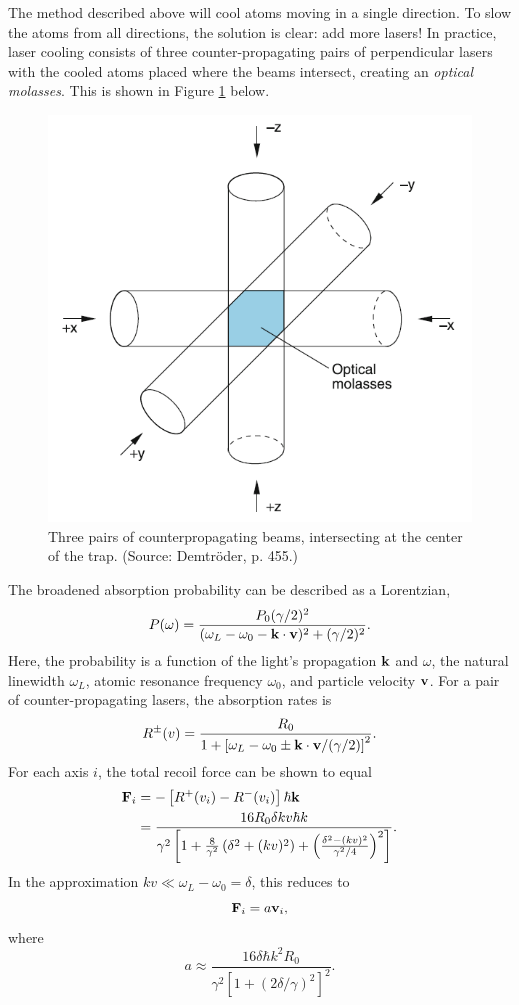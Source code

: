 \documentclass{homework}
\begin{document}
	
	The method described above will cool atoms moving in a single direction. To slow the atoms from all directions, the solution is clear: add more lasers! In practice, laser cooling consists of three counter-propagating pairs of perpendicular lasers with the cooled atoms placed where the beams intersect, creating an \textit{optical molasses}. This is shown in Figure \ref{fig:finaloptmol} below.
	\begin{figure}[H]
		\centering
		\includegraphics[width=0.5\linewidth]{final_optmol}
		\caption{Three pairs of counterpropagating beams, intersecting at the center of the trap. (Source: Demtr\"oder, p. 455.)}
		\label{fig:finaloptmol}
	\end{figure}
	
	The broadened absorption probability can be described as a Lorentzian,
	$$P(\omega) = \frac{P_0(\gamma / 2)^2}{(\omega_L - \omega_0 - \boldsymbol{\mathrm{k}} \cdot \boldsymbol{\mathrm{v}})^2 + (\gamma / 2)^2}.$$
	Here, the probability is a function of the light's propagation $\boldsymbol{\mathrm{k}}$ and $\omega$, the natural linewidth $\omega_L$, atomic resonance frequency $\omega_0$, and particle velocity $\boldsymbol{\mathrm{v}}$. For a pair of counter-propagating lasers, the absorption rates is 
	$$R^\pm(v) = \frac{R_0}{1 + \left[\omega_L - \omega_0 \pm \boldsymbol{\mathrm{k}} \cdot \boldsymbol{\mathrm{v}} / (\gamma / 2)\right]^2}.$$ For each axis $i$, the total recoil force can be shown to equal \begin{align*}
		\boldsymbol{\mathrm{F}}_i & = -\left[R^+(v_i) - R^-(v_i)\right] \hbar \boldsymbol{\mathrm{k}} \\
			& = \frac{16R_0 \delta k v \hbar k}{\gamma^2 \left[
					1 + \frac{8}{\gamma^2} \left( \delta^2 + (kv)^2\right)
					+ \left(\frac{\delta^2 - (kv)^2}{\gamma^2 / 4} \right)^2
				\right]}.
	\end{align*}
	In the approximation $kv \ll \omega_L - \omega_0 = \delta$, this reduces to
	$$\boldsymbol{\mathrm{F}}_i = a \boldsymbol{\mathrm{v}}_i,$$
	where
	$$a \approx \frac{16 \delta \hbar k^2 R_0}{\gamma^2 \left[1 + (2 \delta / \gamma)^2\right]^2}.$$
	
\end{document}
